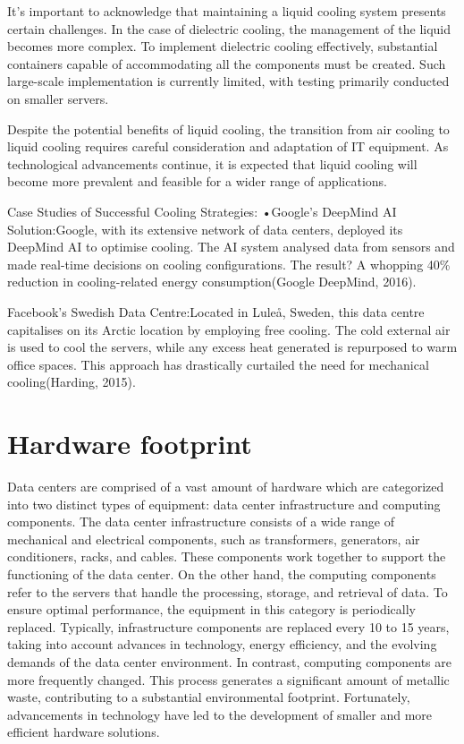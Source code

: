 \documentclass[
  a4paper,  %
  twoside,  %
  bibliography=totoc,
  headsepline,
  cleardoublepage=empty,
  parskip=half,
  draft=false
]{scrbook}
\begin{document}
It's important to acknowledge that maintaining a liquid cooling system presents certain challenges. In the case of dielectric cooling, the management of the liquid becomes more complex. To implement dielectric cooling effectively, substantial containers capable of accommodating all the components must be created. Such large-scale implementation is currently limited, with testing primarily conducted on smaller servers.

Despite the potential benefits of liquid cooling, the transition from air cooling to liquid cooling requires careful consideration and adaptation of IT equipment. As technological advancements continue, it is expected that liquid cooling will become more prevalent and feasible for a wider range of applications.


Case Studies of Successful Cooling Strategies:
•Google's  DeepMind  AI  Solution:Google,  with  its  extensive  network  of  data centers, deployed its DeepMind AI to optimise cooling. The AI system analysed data from sensors and  made  real-time  decisions on  cooling  configurations.  The  result?  A  whopping  40\% reduction in cooling-related energy consumption(Google DeepMind, 2016).

Facebook's Swedish Data Centre:Located in Luleå, Sweden, this data centre capitalises on its Arctic location by employing free cooling. The cold external air is used to cool the servers, while any excess heat generated is repurposed to warm office spaces. This approach has drastically curtailed the need for mechanical cooling(Harding, 2015).




\chapter{Hardware footprint}
Data centers are comprised of a vast amount of hardware which are categorized into two distinct types of equipment: data center infrastructure and computing components. The data center infrastructure consists of a wide range of mechanical and electrical components, such as transformers, generators, air conditioners, racks, and cables. These components work together to support the functioning of the data center. On the other hand, the computing components refer to the servers that handle the processing, storage, and retrieval of data. To ensure optimal performance, the equipment in this category is periodically replaced. Typically, infrastructure components are replaced every 10 to 15 years, taking into account advances in technology, energy efficiency, and the evolving demands of the data center environment.\cite{samaye2024energy} In
contrast, computing components are more frequently changed. This process generates a significant amount of metallic waste, contributing to a substantial environmental footprint. Fortunately, advancements in technology have led to the development of smaller and more efficient hardware solutions.
\end{document}
